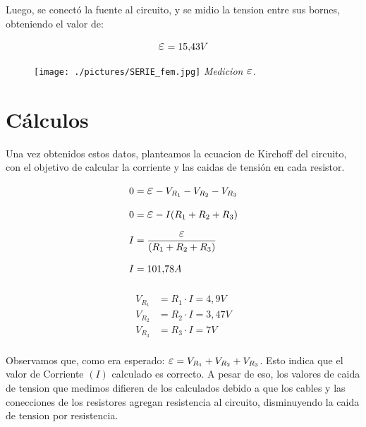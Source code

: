 \documentclass[12pt]{report}
\newcommand {\LEpsilon}{\mathlarger{\mathlarger{\varepsilon}}}
\begin{document}
Luego, se conectó la fuente al circuito, y se midio la tension entre sus bornes, obteniendo el
valor de:
\noindent
\begin{figure}[h]
  \centering
  \begin{minipage}[h]{0.4\textwidth}
    \centering
    \vspace{-2em}
    $$\LEpsilon = 15,\!43V$$
  \end{minipage}\hskip 5mm
  \begin{minipage}[h]{0.4\textwidth}
    \centering
    \texttt{[image: ./pictures/SERIE\_fem.jpg]}
    \textit{Medicion $\LEpsilon$.}
  \end{minipage}
\end{figure}

\section{Cálculos}

Una vez obtenidos estos datos, planteamos la ecuacion de Kirchoff del circuito,
con el objetivo de calcular la corriente y las caidas de tensión en cada resistor.

\begin{minipage}[t]{0.48\textwidth}
  $$
  \begin{aligned}
    0 &= \LEpsilon - V_{R_1} - V_{R_2} - V_{R_3}\\[6pt]
    0 &= \LEpsilon - I (R_1 + R_2 + R_3)\\[6pt]
    I &= \frac{\LEpsilon}{(R_1 + R_2 + R_3)}\\[6pt]
    I &= 101,\!78A\\[6pt]
  \end{aligned}
  $$
\end{minipage}
\hfill
\begin{minipage}[t]{0.48\textwidth}
  \vspace{7mm}
  $$
  \begin{aligned}
    V_{R_1} &= R_1 \cdot I = 4,\!9 V\\[6pt]
    V_{R_2} &= R_2 \cdot I = 3,\!47 V\\[6pt]
    V_{R_3} &= R_3 \cdot I = 7 V\\[6pt]
  \end{aligned}
  $$
\end{minipage}

Observamos que, como era esperado: $\LEpsilon =  V_{R_1} + V_{R_2} + V_{R_3}$. Esto 
indica que el valor de Corriente $(I)$ calculado es correcto. A pesar de eso, los valores de caida de tension que medimos difieren de los calculados debido a que los cables y las conecciones de los resistores agregan resistencia al circuito, disminuyendo la caida de tension por resistencia.
\end{document}
